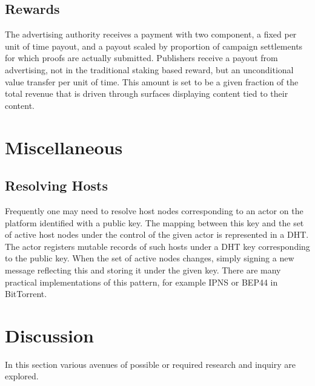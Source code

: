 \documentclass{article}
\begin{document}
\subsection{Rewards}

The advertising authority receives a payment with two component, a fixed per unit of time payout, and a payout scaled by proportion of campaign settlements for which proofs are actually submitted. Publishers receive a payout from advertising, not in the traditional staking based reward, but an unconditional value transfer per unit of time. This amount is set to be a given fraction of the total revenue that is driven through surfaces displaying content tied to their content.


\section{Miscellaneous}

\subsection{Resolving Hosts}

Frequently one may need to resolve host nodes corresponding to an actor on the platform identified with a public key. The mapping between this key and the set of active host nodes under the control of the given actor is represented in a DHT. The actor registers mutable records of such hosts under a DHT key corresponding to the public key. When the set of active nodes changes, simply signing a new message reflecting this and storing it under the given key. There are many practical implementations of this pattern, for example IPNS or BEP44 in BitTorrent.

\section{Discussion} \label{sec:discussion}

In this section various avenues of possible or required research and inquiry are explored.
\end{document}
